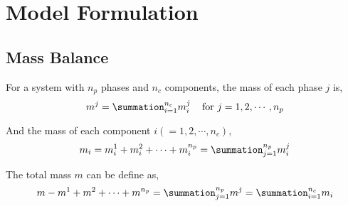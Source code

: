

\section{Model Formulation}
 
\subsection{Mass Balance}
For a system with $n_{p}$ phases and $n_{c}$ components, the mass of each phase $j$ is,
\begin{equation}
m^{j} = \summation_{i=1}^{n_{c}}m_{i}^{j}\;\;\;\text{ for }j=1,2,\cdots,n_{p}
\label{Eqn_MassBalance_Phase}
\end{equation}

And the mass of each component $i\left(=1,2,\cdots,n_{c}\right)$,
\begin{equation}
m_{i} = m_{i}^{1} + m_{i}^{2} + \cdots + m_{i}^{n_{p}} = \summation_{j=1}^{n_{p}}m_{i}^{j}
\label{Eqn_MassBalance_Component}
\end{equation}

The total mass $m$ can be define as,
\begin{equation}
m - m^{1} + m^{2} + \cdots + m^{n_{p}} = \summation_{j=1}^{n_{p}}m^{j} = \summation_{i=1}^{n_{c}}m_{i}
\label{Eqn_MassBalance_Mass}
\end{equation}

